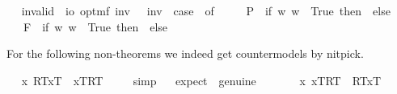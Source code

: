 \begin{isabellebody}
\ \isamarkupfalse%
\ invalid\ {\isacharcolon}{\isacharcolon}\ {\isachardoublequoteopen}io\ opt{\isasymRightarrow}mf{\isachardoublequoteclose}\ {\isacharparenleft}{\isachardoublequoteopen}{\isacharbrackleft}{\isacharunderscore}{\isacharbrackright}\isactrlsup i\isactrlsup n\isactrlsup v{\isachardoublequoteclose}\ {\isacharbrackleft}{}{\isacharbrackright}{\isacharparenright}\ \ {\isachardoublequoteopen}{\isacharbrackleft}{\isasymphi}{\isacharbrackright}\isactrlsup i\isactrlsup n\isactrlsup v\ {\isasymequiv}\ case\ {\isasymphi}\ of\ \isanewline
\ \ \ \ P{\isacharparenleft}{\isasympsi}{\isacharparenright}\ {\isasymRightarrow}\ if\ {\isasymforall}w{\isachardot}{\isasymnot}{\isacharparenleft}{\isasympsi}\ w{\isacharparenright}\ {\isasymlongleftrightarrow}\ True\ then\ {\isasymtop}\ else\ {\isasymbottom}\ \isanewline
\ \ {\isacharbar}\ F{\isacharparenleft}{\isasympsi}{\isacharparenright}\ {\isasymRightarrow}\ if\ {\isasymforall}w{\isachardot}{\isasymnot}{\isacharparenleft}{\isasympsi}\ w{\isacharparenright}\ {\isasymlongleftrightarrow}\ True\ then\ {\isasymtop}\ else\ {\isasymbottom}\ {\isacharbar}\ {\isacharunderscore}\ {\isasymRightarrow}\ {\isacharasterisk}{\isachardoublequoteclose}%
\isamarkuptrue%
%
\isamarkuptrue%
%
\begin{isamarkuptext}%
For the following non-theorems we indeed get countermodels by nitpick.%
\end{isamarkuptext}%
\isamarkuptrue%
\ \isamarkupfalse%
\ {\isachardoublequoteopen}{\isacharbrackleft}{\isacharparenleft}\isactrlbold {\isasymforall}x{\isachardot}\ {\isasymlparr}R\isactrlsup T{\isacharcomma}x\isactrlsup T{\isasymrparr}\ \isactrlbold {\isasymrightarrow}\ {\isasymlbrace}x\isactrlsup T{\isacharcomma}R\isactrlsup T{\isasymrbrace}{\isacharparenright}{\isacharbrackright}\ {\isacharequal}\ {\isasymtop}{\isachardoublequoteclose}%
\isadelimproof
\ %
\endisadelimproof
%
\isatagproof
{}\isamarkupfalse%
\ simp%
\endisatagproof
{\isafoldproof}%
%
\isadelimproof
%
\endisadelimproof
\ \isamarkupfalse%
\ {\isacharbrackleft}expect\ {\isacharequal}\ genuine{\isacharbrackright}%
\isadelimproof
\ \ %
\endisadelimproof
%
\isatagproof
{}\isamarkupfalse%
\ %
%
\endisatagproof
{\isafoldproof}%
%
\isadelimproof
%
\endisadelimproof
\isanewline
\ \isamarkupfalse%
\ {\isachardoublequoteopen}{\isacharbrackleft}{\isacharparenleft}\isactrlbold {\isasymforall}x{\isachardot}\ {\isasymlbrace}x\isactrlsup T{\isacharcomma}R\isactrlsup T{\isasymrbrace}\ \isactrlbold {\isasymrightarrow}\ {\isasymlparr}R\isactrlsup T{\isacharcomma}x\isactrlsup T{\isasymrparr}{\isacharparenright}{\isacharbrackright}\ {\isacharequal}\ {\isasymtop}{\isachardoublequoteclose}%

\end{isabellebody}
